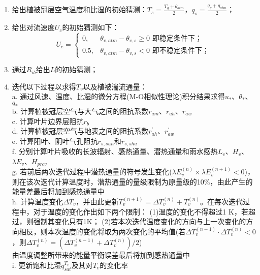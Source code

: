 \begin{enumerate}
    \item 给出植被冠层空气温度和比湿的初始猜测：$T_s=\frac{T_g+\theta_{atm}}{2}$，$q_s=\frac{q_g+q_{atm}}{2}$；
    \item 给出对流速度$U_c$的初始猜测如下：\\
    \begin{equation*}
    U_c= \begin{cases}
      0,  & \theta_{v,atm}-\theta_{v,s}\geqslant0 \text{ 即稳定条件下；} \\
      0.5, & \theta_{v,atm}-\theta_{v,s}<0 \text{ 即不稳定条件下；}
     \end{cases}
    \end{equation*}
    \item 通过$R_{ib}$给出$L$的初始猜测；
    \item 迭代以下过程以求得$T_v$以及植被湍流通量：\\
    a. 通过风速、温度、比湿的微分方程(M-O相似性理论)积分结果求得$u_\ast$、$\theta_\ast$、$q_\ast$ \\
    b. 计算植被冠层空气与大气之间的阻抗系数$r_{am}$、$r_{ah}$、$r_{aw}$ \\
    c. 计算叶片边界层阻抗$r_b$ \\
    d. 计算植被冠层空气与地表之间的阻抗系数$r_{ah}^\prime$、$r_{aw}^\prime$ \\
    e. 计算阳叶、阴叶气孔阻抗$r_{s,sun}$和$r_{s,sha}$ \\
    f. 分别计算叶片吸收的长波辐射、感热通量、潜热通量和雨水感热$L_v$、$H_{v}$、$\lambda E_{v}$、$H_{prcv}$ \\
    g. 若前后两次迭代过程中潜热通量的符号发生变化($\lambda E_{v}^{\left(n\right)}\times\lambda E_{v}^{\left(n+1\right)}<0$)，
    则在该次迭代计算温度时，潜热通量的量级限制为原量级的10\%，由此产生的能量差最后将加到感热通量中 \\
    h. 计算温度变化$\Delta T_v$，并由此更新$T_v^{\left(n+1\right)}=\Delta T_v^{\left(n\right)}+T_v^{\left(n\right)}$。在每次迭代过程中，对于温度的变化作出如下两个限制：
    (1)温度的变化不得超过1 K，若超过，则强制其变化只有1K；
    (2)若本次迭代温度变化的方向与上一次变化的方向相反，则本次温度的变化将取为两次变化的平均值(若$\Delta T_v^{\left(n-1\right)} \cdot \Delta T_v^{\left(n\right)}<0$，则$\Delta T_v^{\left(n\right)}=\left(\Delta T_v^{\left(n-1\right)}+\Delta T_v^{\left(n\right)}\right)/2$)\\
    由温度调整所带来的能量平衡误差最后将加到感热通量中\\
    i. 更新饱和比湿$q_{sat}^{T_v}$及其对$T_v$的变化率 \\

\end{enumerate}
